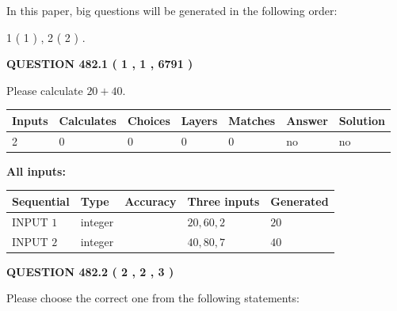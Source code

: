 \documentclass[12pt]{article}
\begin{document}
\vspace{0.2in}
   
In this paper, big questions will be generated in the following order: 
   
   
   1 ( 1 )
 ,
   2 ( 2 )
 .
  
\vspace{0.2in}
  
{\textbf{\Large{QUESTION
482.1 
 ( 1 , 1 , 6791 )
}}}
  
  
 
Please calculate $ %
20 +  %
40 $.
 
 
   
   
   
   
\noindent\begin{tabular}{|l|l|l|l|l|l|l|}
 \hline
Inputs & Calculates & Choices & Layers & Matches & Answer & Solution \\ \hline
 2  & 
 0  & 
 0
  & 
 0  & 
 0  & 
  no & 
  no 
  \\ \hline
 \end{tabular}
   
   
   
   
\noindent{}
   
   
   
   
\noindent\vspace{0.1in}\hspace{-0.08in} {\textbf{\Large{All inputs: }}}
   
   
  
  
\noindent\begin{tabular}{|l|l|l|l|l|}
\hline
 Sequential & Type & Accuracy & Three inputs & Generated \\ 
\hline
 
 
  INPUT $  1 $ & integer &  & $
 20
 , 
 60
 , 
 2
 $ & $ 20 $ 
 \\  \hline  
 
 
  INPUT $  2 $ & integer &  & $
 40
 , 
 80
 , 
 7
 $ & $ 40 $ 
 \\  \hline  
 \end{tabular}
   
   
  
\vspace{0.2in}
  
{\textbf{\Large{QUESTION
482.2 
 ( 2 , 2 , 3 )
}}}
  
  
Please choose the correct one from the following statements:
 
\end{document}

